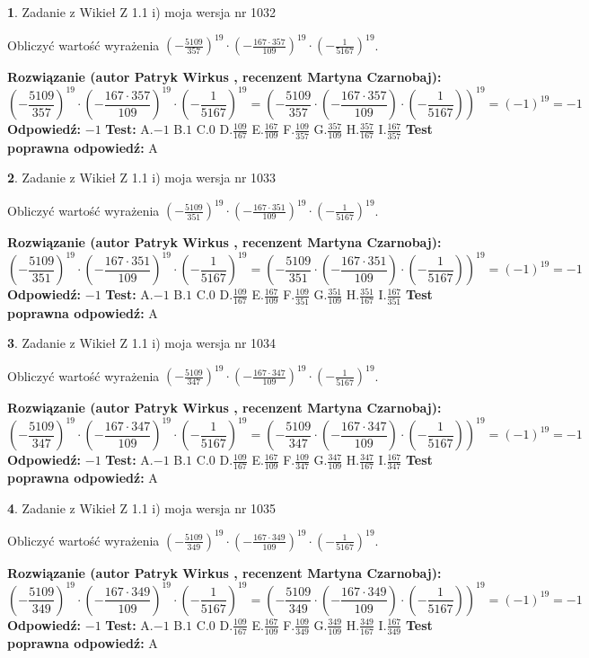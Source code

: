 \documentclass[12pt, a4paper]{article}
\theoremstyle{definition} %
\newtheorem{zad}{}
\newcommand{\zadStart}[1]{\begin{zad}#1\newline}
\newcommand{\zadStop}{\end{zad}}
\newcommand{\rozwStart}[2]{\noindent \textbf{Rozwiązanie (autor #1 , recenzent #2): }\newline}
\newcommand{\rozwStop}{\newline}
\newcommand{\odpStart}{\noindent \textbf{Odpowiedź:}\newline}
\newcommand{\odpStop}{\newline}
\newcommand{\testStart}{\noindent \textbf{Test:}\newline}
\newcommand{\testStop}{\newline}
\newcommand{\kluczStart}{\noindent \textbf{Test poprawna odpowiedź:}\newline}
\newcommand{\kluczStop}{\newline}
\begin{document}
\zadStart{Zadanie z Wikieł Z 1.1 i) moja wersja nr 1032}

Obliczyć wartość wyrażenia $(-\frac{5109}{357})^{19} \cdot (-\frac{167 \cdot 357}{109})^{19} \cdot (-\frac{1}{5167})^{19}$.
\zadStop
\rozwStart{Patryk Wirkus}{Martyna Czarnobaj}
$$(-\frac{5109}{357})^{19} \cdot (-\frac{167 \cdot 357}{109})^{19} \cdot (-\frac{1}{5167})^{19} = (-\frac{5109}{357} \cdot (-\frac{167 \cdot 357}{109}) \cdot (-\frac{1}{5167}))^{19} = (-1)^{19} = -1$$
\rozwStop
\odpStart
$-1$
\odpStop
\testStart
A.$-1$ B.$1$ C.$0$ D.$\frac{109}{167}$ E.$\frac{167}{109}$
F.$\frac{109}{357}$ G.$\frac{357}{109}$
H.$\frac{357}{167}$
I.$\frac{167}{357}$
\testStop
\kluczStart
A
\kluczStop



\zadStart{Zadanie z Wikieł Z 1.1 i) moja wersja nr 1033}

Obliczyć wartość wyrażenia $(-\frac{5109}{351})^{19} \cdot (-\frac{167 \cdot 351}{109})^{19} \cdot (-\frac{1}{5167})^{19}$.
\zadStop
\rozwStart{Patryk Wirkus}{Martyna Czarnobaj}
$$(-\frac{5109}{351})^{19} \cdot (-\frac{167 \cdot 351}{109})^{19} \cdot (-\frac{1}{5167})^{19} = (-\frac{5109}{351} \cdot (-\frac{167 \cdot 351}{109}) \cdot (-\frac{1}{5167}))^{19} = (-1)^{19} = -1$$
\rozwStop
\odpStart
$-1$
\odpStop
\testStart
A.$-1$ B.$1$ C.$0$ D.$\frac{109}{167}$ E.$\frac{167}{109}$
F.$\frac{109}{351}$ G.$\frac{351}{109}$
H.$\frac{351}{167}$
I.$\frac{167}{351}$
\testStop
\kluczStart
A
\kluczStop



\zadStart{Zadanie z Wikieł Z 1.1 i) moja wersja nr 1034}

Obliczyć wartość wyrażenia $(-\frac{5109}{347})^{19} \cdot (-\frac{167 \cdot 347}{109})^{19} \cdot (-\frac{1}{5167})^{19}$.
\zadStop
\rozwStart{Patryk Wirkus}{Martyna Czarnobaj}
$$(-\frac{5109}{347})^{19} \cdot (-\frac{167 \cdot 347}{109})^{19} \cdot (-\frac{1}{5167})^{19} = (-\frac{5109}{347} \cdot (-\frac{167 \cdot 347}{109}) \cdot (-\frac{1}{5167}))^{19} = (-1)^{19} = -1$$
\rozwStop
\odpStart
$-1$
\odpStop
\testStart
A.$-1$ B.$1$ C.$0$ D.$\frac{109}{167}$ E.$\frac{167}{109}$
F.$\frac{109}{347}$ G.$\frac{347}{109}$
H.$\frac{347}{167}$
I.$\frac{167}{347}$
\testStop
\kluczStart
A
\kluczStop



\zadStart{Zadanie z Wikieł Z 1.1 i) moja wersja nr 1035}

Obliczyć wartość wyrażenia $(-\frac{5109}{349})^{19} \cdot (-\frac{167 \cdot 349}{109})^{19} \cdot (-\frac{1}{5167})^{19}$.
\zadStop
\rozwStart{Patryk Wirkus}{Martyna Czarnobaj}
$$(-\frac{5109}{349})^{19} \cdot (-\frac{167 \cdot 349}{109})^{19} \cdot (-\frac{1}{5167})^{19} = (-\frac{5109}{349} \cdot (-\frac{167 \cdot 349}{109}) \cdot (-\frac{1}{5167}))^{19} = (-1)^{19} = -1$$
\rozwStop
\odpStart
$-1$
\odpStop
\testStart
A.$-1$ B.$1$ C.$0$ D.$\frac{109}{167}$ E.$\frac{167}{109}$
F.$\frac{109}{349}$ G.$\frac{349}{109}$
H.$\frac{349}{167}$
I.$\frac{167}{349}$
\testStop
\kluczStart
A
\kluczStop
\end{document}
